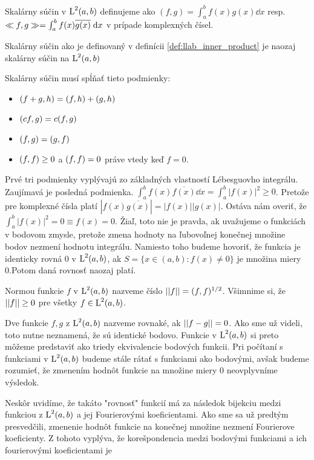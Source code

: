 \begin{definicia}
    Skalárny súčin v $\mbox{L}^2(a,b)$ definujeme ako
    $(f,g) = \int_a^b f(x) g(x) \dd x$ resp. 
    $\ll f,g \gg = \int_a^b f(x) \overline{g(x)} \; \mathrm{d} x$ v prípade
    komplexných čísel.
    \label{def:llab_inner_product}
\end{definicia}
\begin{lema}
    Skalárny súčin ako je definovaný v definícii
    \ref{def:llab_inner_product}
    je naozaj skalárny súčin na $\mbox{L}^2(a,b)$
\end{lema}
\begin{dokaz}
Skalárny súčin musí spĺňať tieto podmienky:
\begin{itemize}
    \item $( f+g,h ) = ( f,h ) + ( g,h )$
    \item $( cf,g ) = c ( f,g )$
    \item $( f,g ) = ( g,f )$
    \item $( f,f ) \ge 0$ a $( f,f )=0$ práve vtedy keď $f=0$.
\end{itemize}
Prvé tri podmienky vyplývajú zo základných vlastností Lébesguovho
integrálu. Zaujímavá je posledná podmienka.
$\int_a^b f(x) \overline{f(x)} \dd x = \int_a^b |f(x)|^2 \ge 0$.
Pretože pre komplexné čísla platí $|f(x)\overline{g(x)}|=|f(x)||g(x)|$.
Ostáva nám overiť, že $\int_a^b |f(x)|^2 = 0 \equiv f(x)=0$.
Žiaľ, toto nie je pravda, ak uvažujeme o funkciách v bodovom zmysle,
pretože zmena hodnoty na ľubovoľnej konečnej množine bodov nezmení
hodnotu integrálu. Namiesto toho budeme hovoriť, že
funkcia je identicky rovná 0 v $\mbox{L}^2(a,b)$, ak $S = \{x\in(a,b):
f(x)\not=0\}$ je množina miery 0.Potom daná rovnosť naozaj platí.
\end{dokaz}

\begin{definicia}
    Normou funkcie $f$ v $\mbox{L}^2(a,b)$ nazveme číslo
    $||f|| = ( f,f )^{1/2}$.
    Všimnime si, že $||f||\ge0$ pre všetky $f\in \mbox{L}^2(a,b)$.
\end{definicia}

\begin{definicia}
    Dve funkcie $f,g$ z $\mbox{L}^2(a,b)$ nazveme rovnaké, ak
    $||f-g||=0$. Ako sme už videli, toto nutne neznamená, že sú
    identické bodovo. Funkcie v $\mbox{L}^2(a,b)$ si preto môžeme predstaviť ako
    triedy ekvivalencie bodových funkcii. Pri počítaní s funkciami v
    $\mbox{L}^2(a,b)$ budeme stále rátať s funkciami ako bodovými, avšak budeme
    rozumieť, že zmenením hodnôt funkcie na množine miery 0
    neovplyvníme výsledok.
\end{definicia}

\begin{poznamka}
    Neskôr uvidíme, že takáto "rovnosť" funkcií má za následok
    bijekciu medzi funkciou z $\mbox{L}^2(a,b)$ a jej Fourierovými
    koeficientami. Ako sme sa už predtým presvedčili, zmenenie hodnôt
    funkcie na konečnej množine nezmení Fourierove koeficienty.
    Z tohoto vyplýva, že korešpondencia medzi bodovými funkciami a ich
    fourierovými koeficientami je 
\end{poznamka}

